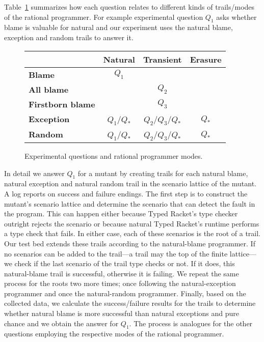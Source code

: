 Table~\ref{fig:experiment-outline} summarizes how each question relates to
different kinds of trails/modes of the rational programmer. For example experimental
question $Q_1$ asks whether blame is valuable for natural and our experiment
uses the natural blame, exception and random trails to answer it.

\begin{figure}[ht]
\center
{\begin{tabular}{l|c|c|c}
                        & {\bf Natural}        & {\bf Transient}          & {\bf Erasure} \\ \hline 
{\bf Blame}             &       $Q_1$          &                          &               \\
{\bf All blame}         &                      &     $Q_2$                &               \\
{\bf Firstborn blame}   &                      &     $Q_3$                &               \\
{\bf Exception}         &       $Q_1$/$Q_*$    &     $Q_2$/$Q_3$/$Q_*$    &      $Q_*$    \\
{\bf Random}            &       $Q_1$/$Q_*$    &     $Q_2$/$Q_3$/$Q_*$    &      $Q_*$    \\
\end{tabular}}
  \caption{ Experimental questions and rational programmer modes.}
  \label{fig:experiment-outline}
\end{figure}


In detail we answer $Q_1$ for a mutant by creating trails for each natural blame,
natural exception and natural random trail in the scenario lattice of the mutant. A
log reports on success and failure endings.  The first step is to construct the
mutant's scenario lattice and determine the scenario that can detect the fault in
the program. This can happen either because Typed Racket's type checker outright
rejects the scenario or because natural Typed Racket's runtime performs a type check
that fails. In either case, each of these scenarios is the root of a trail. Our test
bed extends these trails according to the natural-blame programmer.  If no scenarios
can be added to the trail---a trail may the top of the finite lattice---we check if
the last scenario of the trail type checks or not. If it does, this natural-blame
trail is successful, otherwise it is failing. We repeat the same process for the
roots two more times; once following the natural-exception programmer and once the
natural-random programmer. Finally, based on the collected data, we calculate the
success/failure results for the trails to determine whether natural blame is more
successful than natural exceptions and pure chance and we obtain the answer for
$Q_1$.  The process is analogues for the other questions employing the respective
modes of the rational programmer.


